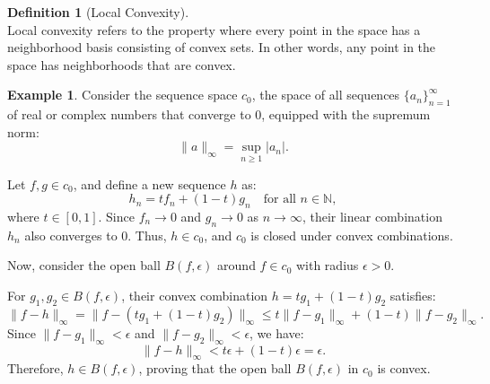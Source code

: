 \documentclass[12pt, reqno]{amsart}
\theoremstyle{definition}
\newtheorem{definition}[theorem]{Definition}
\newtheorem{example}[theorem]{Example}
\numberwithin{equation}{section}
\newcommand{\dR}{{\mathbb R}}
\begin{document}
\begin{definition} [Local Convexity] \hfill \\
    Local convexity refers to the property where every point in the space has a neighborhood basis consisting of convex sets. In other words, any point in the space has neighborhoods that are convex.
\end{definition}
\begin{comment}
\begin{example} Consider the space $\dR^2$ equipped with the standard topology (where open sets are open disks around points). In this space, the convex set $C$ defined as the unit disk:
\[
C = \{ (x, y) \in \dR^2 \mid x^2 + y^2 \leq 1 \}
\]
serves as a neighborhood around the origin $(0, 0)$.\\
For any point $(x_0, y_0) \in \dR^2$, consider an open disk centered at $(x_0, y_0)$ with radius $r > 0$:
\[
B_r(x_0, y_0) = \{ (x, y) \in \dR^2 \mid (x - x_0)^2 + (y - y_0)^2 < r^2 \}.
\]
$B_r(x_0, y_0)$ is convex because, for any two points $(x_1, y_1), (x_2, y_2) \in B_r(x_0, y_0)$ and any $t \in [0, 1]$, the point 
\[
(tx_1 + (1-t)x_2, ty_1 + (1-t)y_2) \in B_r(x_0, y_0)
\]
This follows from the convexity of the Euclidean norm.\\
Since every point in $\dR^2$ can be surrounded by such convex neighborhoods, $\dR^2$ is locally convex.
\end{example}    
\end{comment}


\begin{example}
Consider the sequence space \( c_0 \), the space of all sequences \( \{a_n\}_{n=1}^\infty \) of real or complex numbers that converge to 0, equipped with the supremum norm:
\[
\|a\|_\infty = \sup_{n \geq 1} |a_n|.
\]

Let \( f, g \in c_0 \), and define a new sequence \( h \) as:
\[
h_n = t f_n + (1-t) g_n \quad \text{for all } n \in \mathbb{N},
\]
where \( t \in [0, 1] \). Since \( f_n \to 0 \) and \( g_n \to 0 \) as \( n \to \infty \), their linear combination \( h_n \) also converges to 0. Thus, \( h \in c_0 \), and \( c_0 \) is closed under convex combinations.

Now, consider the open ball \( B(f, \epsilon) \) around \( f \in c_0 \) with radius \( \epsilon > 0 \).

For \( g_1, g_2 \in B(f, \epsilon) \), their convex combination \( h = t g_1 + (1-t) g_2 \) satisfies:
\[
\|f - h\|_\infty = \|f - (t g_1 + (1-t) g_2)\|_\infty \leq t \|f - g_1\|_\infty + (1-t) \|f - g_2\|_\infty.
\]
Since \( \|f - g_1\|_\infty < \epsilon \) and \( \|f - g_2\|_\infty < \epsilon \), we have:
\[
\|f - h\|_\infty < t \epsilon + (1-t) \epsilon = \epsilon.
\]
Therefore, \( h \in B(f, \epsilon) \), proving that the open ball \( B(f, \epsilon) \) in \( c_0 \) is convex.

\end{example}
\end{document}
